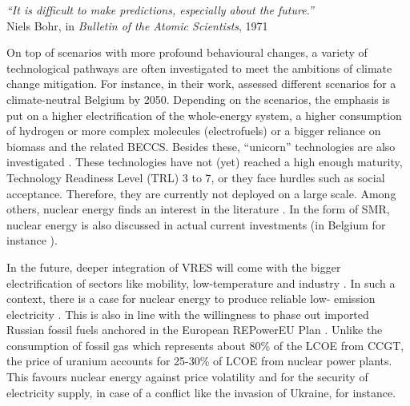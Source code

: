 \vspace{-0.2cm}
\begin{flushright}
\emph{``It is difficult to make predictions, especially about the future.''}\\
Niels Bohr, in \textit{Bulletin of the Atomic Scientists}, 1971
\end{flushright}
\vspace{0.4cm}

On top of scenarios with more profound behavioural changes, a variety of technological pathways are often investigated to meet the ambitions of climate change mitigation. For instance, in their work, \citet{My2050} assessed different scenarios for a climate-neutral Belgium by 2050. Depending on the scenarios, the emphasis is put on a higher electrification of the whole-energy system, a higher consumption of hydrogen or more complex molecules (\ie electrofuels) or a bigger reliance on biomass and the related \gls{BECCS}. Besides these, ``unicorn'' technologies are also investigated \cite{heuberger2018impact}. These technologies have not (yet) reached a high enough maturity, \ie Technology Readiness Level (TRL) 3 to 7, or they face hurdles such as social acceptance. Therefore, they are currently not deployed on a large scale. Among others, nuclear energy finds an interest in the literature \cite{IEA_Nuclear_2022,PATHS2050}. In the form of \acrfull{SMR}, nuclear energy is also discussed in actual current investments (in Belgium for instance \cite{SMRlesoir}).

In the future, deeper integration of \gls{VRES} will come with the bigger electrification of sectors like mobility, low-temperature and industry \cite{IEA2023electrification}. In such a context, there is a case for nuclear energy to produce reliable low- emission electricity \cite{IAEA2008}. This is also in line with the willingness to phase out imported Russian fossil fuels anchored in the European REPowerEU Plan \cite{REPowerEU}. Unlike the consumption of fossil gas which represents about 80\% of the \gls{LCOE} from \gls{CCGT}, the price of uranium accounts for 25-30\% of \gls{LCOE} from nuclear power plants. This favours nuclear energy against price volatility and for the security of electricity supply, in case of a conflict like the invasion of Ukraine, for instance.


